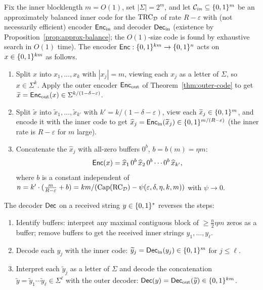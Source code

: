 \begin{definition}
  \label{def:construction}
  Fix the inner blocklength $m=O(1)$, set $|\Sigma|=2^m$, and let
  $\mathcal{C}_{in}\subseteq\{0,1\}^m$ be an approximately balanced inner code for the
  $\mathrm{TRC}_{\mathcal{D}}$ of rate $R-\varepsilon$ with (not necessarily efficient) encoder
  $\mathsf{Enc}_{\mathrm{in}}$ and decoder $\mathsf{Dec}_{\mathrm{in}}$ (existence by
  Proposition~\ref{prop:approx-balance}; the $O(1)$-size code is found by
  exhaustive search in $O(1)$ time). The encoder
  $\mathsf{Enc}:\{0,1\}^{km}\to\{0,1\}^n$ acts on $x\in\{0,1\}^{km}$ as follows.
  \begin{enumerate}
    \item Split $x$ into $x_1,\dots,x_k$ with $|x_j|=m$, viewing each $x_j$ as a
      letter of $\Sigma$, so $x\in\Sigma^k$. Apply the outer encoder $\mathsf{Enc}_{\mathrm{out}}$ of
      Theorem~\ref{thm:outer-code} to get
      $\widetilde x=\mathsf{Enc}_{\mathrm{out}}(x)\in\Sigma^{k/(1-\delta-\varepsilon)}$.
    \item Split $\widetilde x$ into $\widetilde x_1,\dots,\widetilde x_{k'}$ with
      $k'=k/(1-\delta-\varepsilon)$, view each $\widetilde x_j\in\{0,1\}^m$, and
      encode it with the inner code to get
      $\widehat x_j=\mathsf{Enc}_{\mathrm{in}}(\widetilde x_j)\in\{0,1\}^{m/(R-\varepsilon)}$ (the inner
      rate is $R-\varepsilon$ for $m$ large).
    \item Concatenate the $\widehat x_j$ with all-zero buffers $0^b$, $b=b(m)=\eta m$:
      \[
        \mathsf{Enc}(x) = \widehat x_1\,0^b\,\widehat x_2\,0^b\cdots0^b\,\widehat x_{k'},
      \]
      where $b$ is a constant independent of $n=k'\cdot(\tfrac{m}{R-\varepsilon}+b)
      = km/(\mathrm{Cap}(\mathrm{RC}_{\mathcal{D}})-\psi(\varepsilon,\delta,\eta,k,m))$ with $\psi\to0$.
  \end{enumerate}
  The decoder $\mathsf{Dec}$ on a received string $y\in\{0,1\}^*$ reverses the steps:
  \begin{enumerate}
    \item Identify buffers: interpret any maximal contiguous block of
      $\ge\tfrac{n}{2}\eta m$ zeros as a buffer; remove buffers to get the
      received inner strings $y_1,\dots,y_\ell$.
    \item Decode each $y_j$ with the inner code:
      $\widetilde y_j=\mathsf{Dec}_{\mathrm{in}}(y_j)\in\{0,1\}^m$ for $j\le\ell$.
    \item Interpret each $\widetilde y_j$ as a letter of $\Sigma$ and decode the
      concatenation $\widetilde y=\widetilde y_1\cdots\widetilde y_\ell\in\Sigma^\ell$
      with the outer decoder: $\mathsf{Dec}(y)=\mathsf{Dec}_{\mathrm{out}}(\widetilde y)\in\{0,1\}^{km}$.
  \end{enumerate}
\end{definition}

